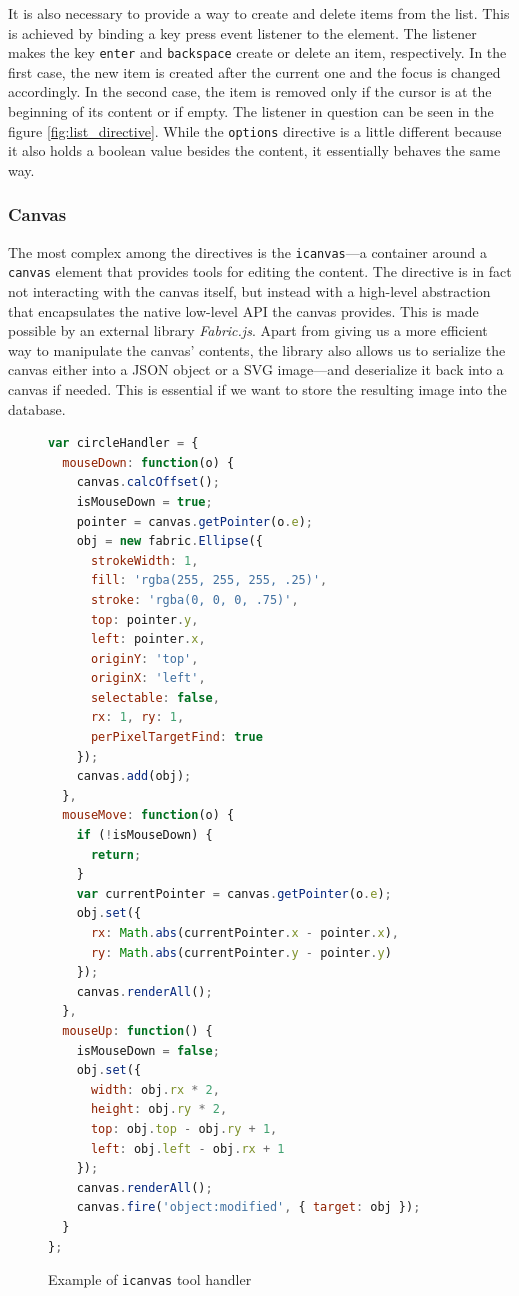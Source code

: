 \documentclass[thesis=M,english,hidelinks]{FITthesis}[2012/10/20]
\newcommand{\code}{\texttt}
\begin{document}
It is also necessary to provide a way to create and delete items from the list. This is achieved by binding a key press event listener to the element. The listener makes the key \code{enter} and \code{backspace} create or delete an item, respectively. In the first case, the new item is created after the current one and the focus is changed accordingly. In the second case, the item is removed only if the cursor is at the beginning of its content or if empty. The listener in question can be seen in the figure \ref{fig:list_directive}. While the \code{options} directive is a little different because it also holds a boolean value besides the content, it essentially behaves the same way.

      \subsubsection{Canvas}

The most complex among the directives is the \code{icanvas}---a container around a \code{canvas} element that provides tools for editing the content. The directive is in fact not interacting with the canvas itself, but instead with a high-level abstraction that encapsulates the native low-level API the canvas provides. This is made possible by an external library \textit{Fabric.js}. Apart from giving us a more efficient way to manipulate the canvas' contents, the library also allows us to serialize the canvas either into a JSON object or a SVG image---and deserialize it back into a canvas if needed. This is essential if we want to store the resulting image into the database.

\begin{figure}
  \begin{lstlisting}[language=JavaScript]
var circleHandler = {
  mouseDown: function(o) {
    canvas.calcOffset();
    isMouseDown = true;
    pointer = canvas.getPointer(o.e);
    obj = new fabric.Ellipse({
      strokeWidth: 1,
      fill: 'rgba(255, 255, 255, .25)',
      stroke: 'rgba(0, 0, 0, .75)',
      top: pointer.y,
      left: pointer.x,
      originY: 'top',
      originX: 'left',
      selectable: false,
      rx: 1, ry: 1,
      perPixelTargetFind: true
    });
    canvas.add(obj);
  },
  mouseMove: function(o) {
    if (!isMouseDown) {
      return;
    }
    var currentPointer = canvas.getPointer(o.e);
    obj.set({
      rx: Math.abs(currentPointer.x - pointer.x),
      ry: Math.abs(currentPointer.y - pointer.y)
    });
    canvas.renderAll();
  },
  mouseUp: function() {
    isMouseDown = false;
    obj.set({
      width: obj.rx * 2,
      height: obj.ry * 2,
      top: obj.top - obj.ry + 1,
      left: obj.left - obj.rx + 1
    });
    canvas.renderAll();
    canvas.fire('object:modified', { target: obj });
  }
};
  \end{lstlisting}
  \caption{Example of \code{icanvas} tool handler}
  \label{fig:tool_handler}
\end{figure}
\end{document}

